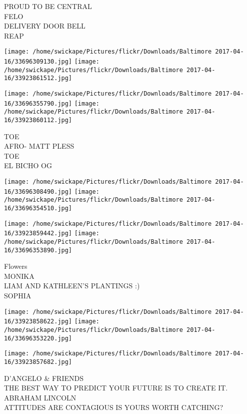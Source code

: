 \documentclass[10pt,letterpaper]{article}
\begin{document}
PROUD TO BE CENTRAL\\
FELO\\
DELIVERY DOOR BELL\\
REAP\\
\pagebreak

\texttt{[image: /home/swickape/Pictures/flickr/Downloads/Baltimore 2017-04-16/33696309130.jpg]}
\texttt{[image: /home/swickape/Pictures/flickr/Downloads/Baltimore 2017-04-16/33923861512.jpg]}

\texttt{[image: /home/swickape/Pictures/flickr/Downloads/Baltimore 2017-04-16/33696355790.jpg]}
\texttt{[image: /home/swickape/Pictures/flickr/Downloads/Baltimore 2017-04-16/33923860112.jpg]}

TOE\\
AFRO{-} MATT PLESS\\
TOE\\
EL BICHO OG\\
\pagebreak

\texttt{[image: /home/swickape/Pictures/flickr/Downloads/Baltimore 2017-04-16/33696308490.jpg]}
\texttt{[image: /home/swickape/Pictures/flickr/Downloads/Baltimore 2017-04-16/33696354510.jpg]}

\texttt{[image: /home/swickape/Pictures/flickr/Downloads/Baltimore 2017-04-16/33923859442.jpg]}
\texttt{[image: /home/swickape/Pictures/flickr/Downloads/Baltimore 2017-04-16/33696353890.jpg]}

Flowers\\
MONIKA\\
LIAM AND KATHLEEN'S PLANTINGS :)\\
SOPHIA\\
\pagebreak

\texttt{[image: /home/swickape/Pictures/flickr/Downloads/Baltimore 2017-04-16/33923858622.jpg]}
\texttt{[image: /home/swickape/Pictures/flickr/Downloads/Baltimore 2017-04-16/33696353220.jpg]}

\vspace{0.25in}
\texttt{[image: /home/swickape/Pictures/flickr/Downloads/Baltimore 2017-04-16/33923857682.jpg]}

D'ANGELO \& FRIENDS\\
THE BEST WAY TO PREDICT YOUR FUTURE IS TO CREATE IT. ABRAHAM LINCOLN\\
ATTITUDES ARE CONTAGIOUS IS YOURS WORTH CATCHING?\\
\pagebreak
\end{document}
